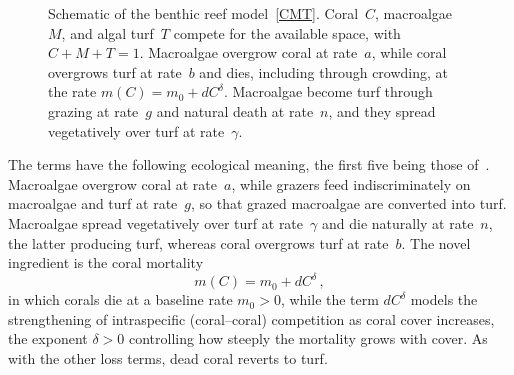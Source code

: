 \documentclass[reqno,11pt]{amsart}
\numberwithin{equation}{section}
\begin{document}
\begin{figure}[H]
\centering
{}
\caption{Schematic of the benthic reef model~\eqref{CMT}. Coral~$C$, macroalgae~$M$, and algal turf~$T$ compete for the available space, with $C+M+T=1$. Macroalgae overgrow coral at rate~$a$, while coral overgrows turf at rate~$b$ and dies, including through crowding, at the rate $m(C)=m_0+dC^{\delta}$. Macroalgae become turf through grazing at rate~$g$ and natural death at rate~$n$, and they spread vegetatively over turf at rate~$\gamma$.}
\label{fig:schematic}
\end{figure}

The terms have the following ecological meaning, the first five being those of~\cite{Mum07}. Macroalgae overgrow coral at rate~$a$, while grazers feed indiscriminately on macroalgae and turf at rate~$g$, so that grazed macroalgae are converted into turf. Macroalgae spread vegetatively over turf at rate~$\gamma$ and die naturally at rate~$n$, the latter producing turf, whereas coral overgrows turf at rate~$b$. The novel ingredient is the coral mortality
\begin{equation}\label{mortality}
m(C)=m_0+dC^{\delta}\,,
\end{equation}
in which corals die at a baseline rate $m_0>0$, while the term $d C^{\delta}$ models the strengthening of intraspecific (coral--coral) competition as coral cover increases, the exponent $\delta>0$ controlling how steeply the mortality grows with cover. As with the other loss terms, dead coral reverts to turf.
\end{document}
